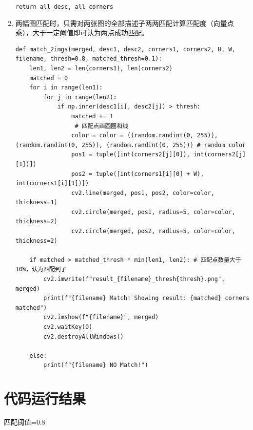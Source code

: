 \documentclass[12pt,a4paper]{article}
\begin{document}
\begin{enumerate}
\begin{lstlisting}[style=py]
    return all_desc, all_corners
\end{lstlisting}
\item 两幅图匹配时，只需对两张图的全部描述子两两匹配计算匹配度（向量点乘），大于一定阈值即可认为两点成功匹配。
\begin{lstlisting}[style=py]
def match_2imgs(merged, desc1, desc2, corners1, corners2, H, W, filename, thresh=0.8, matched_thresh=0.1):
    len1, len2 = len(corners1), len(corners2)
    matched = 0
    for i in range(len1):
        for j in range(len2):
            if np.inner(desc1[i], desc2[j]) > thresh:
                matched += 1
                 # 匹配点画圆圈和线
                color = color = ((random.randint(0, 255)), (random.randint(0, 255)), (random.randint(0, 255))) # random color
                pos1 = tuple([int(corners2[j][0]), int(corners2[j][1])])
                pos2 = tuple([int(corners1[i][0] + W), int(corners1[i][1])])
                cv2.line(merged, pos1, pos2, color=color, thickness=1)
                cv2.circle(merged, pos1, radius=5, color=color, thickness=2)
                cv2.circle(merged, pos2, radius=5, color=color, thickness=2)
    
    if matched > matched_thresh * min(len1, len2): # 匹配点数量大于10%，认为匹配到了
        cv2.imwrite(f"result_{filename}_thresh{thresh}.png", merged)
        print(f"{filename} Match! Showing result: {matched} corners matched")
        cv2.imshow(f"{filename}", merged)
        cv2.waitKey(0)
        cv2.destroyAllWindows()

    else:
        print(f"{filename} NO Match!")
\end{lstlisting}
\end{enumerate}




\section{代码运行结果}

匹配阈值=0.8
\end{document}
